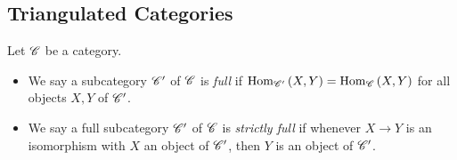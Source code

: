 \documentclass[dissertation.tex]{subfiles}
\begin{document}
\subsection{Triangulated Categories}

\begin{defn}
  Let $\mathscr{C}$ be a category.
  \begin{itemize}
  \item
    We say a subcategory $\mathscr{C}^\prime$ of $\mathscr{C}$ is {\it full} if 
    $\operatorname{Hom}_{\mathscr{C}^\prime}\left(X,Y\right) = \operatorname{Hom}_{\mathscr{C}}\left(X,Y\right)$
    for all objects $X,Y$ of $\mathscr{C}^\prime$.
  \item
    We say a full subcategory $\mathscr{C}^\prime$ of $\mathscr{C}$ is {\it strictly full} if whenever $X \rightarrow Y$ is an isomorphism with $X$ an object of $\mathscr{C}^\prime$, then $Y$ is an object of $\mathscr{C}^\prime$.
  \end{itemize}
\end{defn}
\end{document}
